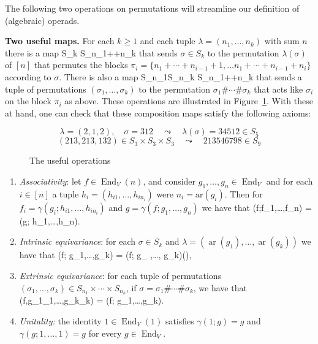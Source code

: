 \documentclass[fleqn, a4paper, twoside]{article}
\makeatletter
\newcommand{\0}{\langle 0\rangle}
\newcommand{\End}{\operatorname{End}}
\newcommand{\ari}{\operatorname{ar}}
\newenvironment{tenumerate}{
 \begin{enumerate}
  \setlength{\itemsep}{0pt}
  \setlength{\parskip}{0pt}
}{\end{enumerate}}
\let\[\@undefined
\DeclareRobustCommand{\[}{\begin{equation}}%
\let\]\@undefined
\DeclareRobustCommand{\]}{\end{equation}}%
\theoremstyle{mytheorem}
\theoremstyle{introthm}
\theoremstyle{mydefinition}
\theoremstyle{mydefinition2}
\theoremstyle{plain} %
\newcommand{\?}{\,?\,}
\theoremstyle{mytheorem}
\theoremstyle{plain} %
\makeatother
\begin{document}
The following two operations on permutations 
will streamline our definition of (algebraic)
operads.

\medskip

\textbf{Two useful maps.} For each $k\geqslant 1$
and each tuple $\lambda = (n_1,\ldots,n_k)$ 
with sum $n$
there is a map
\[ S_k \longrightarrow S_{n_1+\cdots+n_k} \]
that sends $\sigma\in S_k$ to the permutation
$\lambda(\sigma)$ of $[n]$ that permutes the blocks 
$\pi_i = \{n_1+\cdots+n_{i-1}+1,\ldots
			n_1+\cdots+n_{i-1}+n_i\}$
			according to $\sigma$.
There is also a map
\[S_{n_1}\times \cdots \times  S_{n_k} 
	\longrightarrow S_{n_1+\cdots+n_k}  \] 
	that sends a tuple of permutations 
	$(\sigma_1,\ldots,\sigma_k)$ to the
	permutation $\sigma_1\#\cdots \# \sigma_k$
	that acts like $\sigma_i$ on the block $\pi_i$
	as above. These operations are illustrated
	in Figure~\ref{fig:1}. With these at hand, 
one can check that these composition maps
satisfy the following axioms:

\begin{figure}
$$\lambda = (2,1,2), \quad \sigma = 312
	\quad \leadsto \quad \lambda(\sigma) =  34512 \in S_5
	$$
	$$
	(213,213,132)\in S_3\times S_3\times S_3 \quad \leadsto \quad 213546798\in S_9 $$
\caption{The useful operations}
\label{fig:1}
\end{figure}

\begin{tenumerate}
\item \emph{Associativity}: let $f\in \End_V(n)$,
and consider $g_1,\ldots,g_n \in \End_V$ and
for each $i\in [n]$ a tuple $h_i= (h_{i1},\ldots,h_{i n_i})$
were $n_i= \mathrm{ar}(g_i)$. Then for
$f_i = \gamma(g_i; h_{i1},\ldots,h_{in_i})$ 
and $g= \gamma(f; g_1,\ldots,g_n)$ we have
that
\[ \gamma(f;f_1,\ldots,f_n) = 
	\gamma(g; h_1,\ldots,h_n).\]
\item \emph{Intrinsic equivariance}: for
each $\sigma\in S_k$ and $\lambda = (\ari(g_1),\ldots,\ari(g_k))$ we have that
\[ \gamma(f\sigma; g_1,\ldots,g_k) = 	
	\gamma(f; g_{} ,\ldots, 
		g_{\sigma k})\lambda(\sigma),\]
	
\item \emph{Extrinsic equivariance}: for each
tuple of permutations $(\sigma_1,\ldots,\sigma_k) \in S_{n_1} \times
\cdots \times S_{n_k}$, if $\sigma = \sigma_1\#\cdots\#\sigma_k$, we have that
\[\gamma(f,g_1\sigma_1,\ldots,g_k\sigma_k) = 
	\gamma(f; g_1,\ldots,g_k)\sigma.\]
\item \emph{Unitality:} the identity $1\in\End_V(1)$
satisfies $\gamma(1;g) = g$ and $\gamma(g;1,\ldots,1) = g$ for every $g\in\End_V$.
\end{tenumerate}
\end{document}
